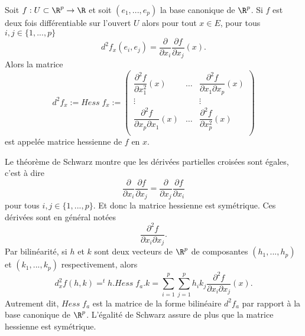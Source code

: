 \documentclass[class=report,crop=false]{standalone}
\begin{document}
\begin{definition}
\textcolor[rgb]{0.73,0.00,0.00}{
  Soit $f: U \subset \R^p \rightarrow \R$ et soit $(e_1,...,e_p)$ la base canonique de $\R^p$.
  Si $f$ est deux fois diff\'erentiable sur l'ouvert $U$ alors pour tout $x \in E$, pour tous $i,j \in \{1,...,p\}$
  \begin{equation*}
    d^2f_x(e_i,e_j)=\dfrac{\partial}{\partial x_i}\dfrac{\partial f}{\partial x_j}(x).
  \end{equation*}
  Alors la matrice
  \begin{equation*}
    d^2f_x:=Hess \;f_x:=\left(
                          \begin{array}{ccc}
                            \dfrac{\partial^2 f}{\partial x_1^2}(x) & \ldots &  \dfrac{\partial^2 f}{\partial x_1 \partial x_p}(x) \\
                            \vdots &  & \vdots \\
                            \dfrac{\partial^2 f}{\partial x_p \partial x_1}(x) & \ldots &  \dfrac{\partial^2 f}{\partial x_p^2}(x) \\
                          \end{array}
                        \right)
  \end{equation*}
  est appel\'ee matrice hessienne de $f$ en $x$.}
\end{definition}
\noindent Le th\'eor\`eme de Schwarz montre que les d\'eriv\'ees partielles crois\'ees sont \'egales, c'est \`a dire
\begin{equation*}
  \dfrac{\partial}{\partial x_i}\dfrac{\partial f}{\partial x_j}=\dfrac{\partial}{\partial x_j}\dfrac{\partial f}{\partial x_i}
\end{equation*}
pour tous $i,j \in \{1,...,p\}$. Et donc la matrice hessienne est sym\'etrique. Ces d\'eriv\'ees sont en g\'en\'eral not\'ees
\begin{equation*}
  \dfrac{\partial^2 f}{\partial x_i \partial x_j}.
\end{equation*}
Par bilin\'earit\'e, si $h$ et $k$ sont deux vecteurs de $\R^p$ de composantes $(h_1,...,h_p)$ et $(k_1,...,k_p)$
respectivement, alors
\begin{equation*}
  d^2_xf(h,k)= ^th. Hess \; f_a.k=\displaystyle \sum_{i=1}^p  \displaystyle \sum_{j=1}^p h_ik_j   \dfrac{\partial^2 f}{\partial x_i \partial x_j}(x).
\end{equation*}
Autrement dit, $Hess \; f_a$ est la matrice de la forme bilin\'eaire $d^2f_a$ par rapport
\`a la base canonique de $\R^p$. L'\'egalit\'e de Schwarz assure de plus que la matrice hessienne est sym\'etrique.
\end{document}
